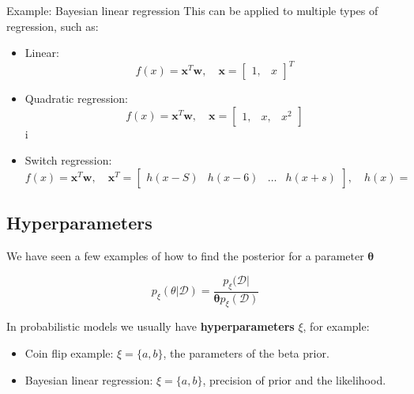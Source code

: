 \begin{example}{Example: Bayesian linear regression}
This can be applied to multiple types of regression, such as:

\begin{itemize}
	\item Linear: \\
		\begin{equation}
			f(x) = \bm{x}^{T}\bm{w}, \quad \bm{x}= \begin{bmatrix} 1,& x \end{bmatrix}^{T}
		\end{equation}
	\item Quadratic regression: \\
		\begin{equation}
			f(x) = \bm{x}^{T}\bm{w}, \quad \bm{x}= \begin{bmatrix} 1,& x,& x^{2} \end{bmatrix}
		\end{equation}i
	\item Switch regression: \\
		\begin{equation}
			f(x) = \bm{x}^{T}\bm{w}, \quad \bm{x}^{T}= \begin{bmatrix} h(x-S)& h(x-6)& \ldots& h(x+s) \end{bmatrix}, \quad h(x) = 
		\end{equation}
\end{itemize}


\end{example}		

\subsection{Hyperparameters}
We have seen a few examples of how to find the posterior for a parameter $\bm{\theta}$ 

\begin{equation}
	p_\xi ( \theta |\mathcal{D}) = \frac{p_\xi (\mathcal{D}|} {\bm{ \theta } p_\xi (\mathcal{D})} 
\end{equation}

In probabilistic models we usually have \textbf{hyperparameters} $\xi $, for example:
\begin{itemize}
	\item Coin flip example: $\xi = \{a,b\} $, the parameters of the beta prior.
	\item Bayesian linear regression: $\xi = \{ a,b\} $, precision of prior and the likelihood.
\end{itemize}

